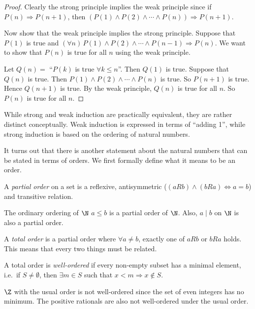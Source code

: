 \documentclass[a4paper]{article}
\begin{document}
\begin{proof}
  Clearly the strong principle implies the weak principle since if $P(n)\Rightarrow P(n + 1)$, then $(P(1)\wedge P(2)\wedge \cdots \wedge P(n))\Rightarrow P(n + 1)$.

  Now show that the weak principle implies the strong principle. Suppose that $P(1)$ is true and $(\forall n)\,P(1)\wedge P(2)\wedge \cdots \wedge P(n - 1)\Rightarrow P(n)$. We want to show that $P(n)$ is true for all $n$ using the weak principle.

  Let $Q(n) = $ ``$P(k)$ is true $\forall k\leq n$''. Then $Q(1)$ is true. Suppose that $Q(n)$ is true. Then $P(1)\wedge P(2)\wedge\cdots \wedge P(n)$ is true. So $P(n+1)$ is true. Hence $Q(n + 1)$ is true. By the weak principle, $Q(n)$ is true for all $n$. So $P(n)$ is true for all $n$.
\end{proof}
While strong and weak induction are practically equivalent, they are rather distinct conceptually. Weak induction is expressed in terms of ``adding 1'', while strong induction is based on the ordering of natural numbers.

It turns out that there is another statement about the natural numbers that can be stated in terms of orders. We first formally define what it means to be an order.

\begin{defi}
  A \emph{partial order} on a set is a reflexive, antisymmetric ($(aRb) \wedge (bRa) \Leftrightarrow a = b$) and transitive relation.
\end{defi}

\begin{eg}
  The ordinary ordering of $\N$ $a\leq b$ is a partial order of $\N$. Also, $a\mid b$ on $\N$ is also a partial order.
\end{eg}

\begin{defi}
  A \emph{total order} is a partial order where $\forall a\not= b$, exactly one of $aRb$ or $bRa$ holds. This means that every two things must be related.
\end{defi}

\begin{defi}
  A total order is \emph{well-ordered} if every non-empty subset has a minimal element, i.e.\ if $S\not= \emptyset$, then $\exists m\in S$ such that $x < m \Rightarrow x\not\in S$.
\end{defi}

\begin{eg}
  $\Z$ with the usual order is not well-ordered since the set of even integers has no minimum. The positive rationals are also not well-ordered under the usual order.
\end{eg}
\end{document}
